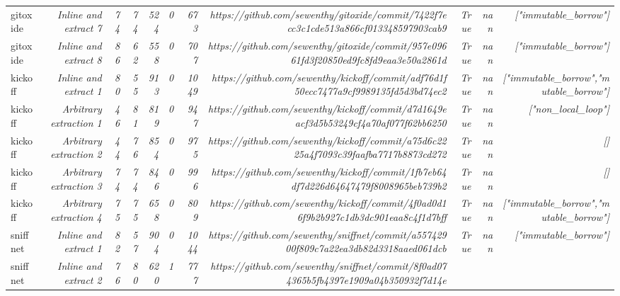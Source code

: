 \begin{table}[]
{\begin{tabular}{lrrrrrrrrrr}
gitoxide & \textit{Inline and extract 7} & \textit{74} & \textit{74} & \textit{524} & \textit{0} & \textit{673} & \textit{https://github.com/sewenthy/gitoxide/commit/7422f7ecc3c1cde513a866cf013348597903cab9
} & \textit{True} & \textit{nan} & \textit{["immutable_borrow"]} \\
gitoxide & \textit{Inline and extract 8} & \textit{86} & \textit{62} & \textit{558} & \textit{0} & \textit{707} & \textit{https://github.com/sewenthy/gitoxide/commit/957e09661fd3f20850ed9fc8fd9eaa3e50a2861d
} & \textit{True} & \textit{nan} & \textit{["immutable_borrow"]} \\
kickoff & \textit{Inline and extract 1} & \textit{80} & \textit{55} & \textit{913} & \textit{0} & \textit{1049} & \textit{https://github.com/sewenthy/kickoff/commit/adf76d1f50ecc7477a9cf9989135fd5d3bd74ec2
} & \textit{True} & \textit{nan} & \textit{["immutable_borrow","mutable_borrow"]} \\
kickoff & \textit{Arbitrary extraction 1} & \textit{46} & \textit{81} & \textit{819} & \textit{0} & \textit{947} & \textit{https://github.com/sewenthy/kickoff/commit/d7d1649eacf3d5b53249cf4a70af077f62bb6250
} & \textit{True} & \textit{nan} & \textit{["non_local_loop"]} \\
kickoff & \textit{Arbitrary extraction 2} & \textit{44} & \textit{76} & \textit{854} & \textit{0} & \textit{975} & \textit{https://github.com/sewenthy/kickoff/commit/a75d6c2225a4f7093c39faafba7717b8873cd272
} & \textit{True} & \textit{nan} & \textit{[]} \\
kickoff & \textit{Arbitrary extraction 3} & \textit{74} & \textit{74} & \textit{846} & \textit{0} & \textit{996} & \textit{https://github.com/sewenthy/kickoff/commit/1fb7eb64df7d226d64647479f8008965beb739b2
} & \textit{True} & \textit{nan} & \textit{[]} \\
kickoff & \textit{Arbitrary extraction 4} & \textit{75} & \textit{75} & \textit{658} & \textit{0} & \textit{809} & \textit{https://github.com/sewenthy/kickoff/commit/4f0ad0d16f9b2b927c1db3dc901eaa8c4f1d7bff
} & \textit{True} & \textit{nan} & \textit{["immutable_borrow","mutable_borrow"]} \\
sniffnet & \textit{Inline and extract 1} & \textit{82} & \textit{57} & \textit{904} & \textit{0} & \textit{1044} & \textit{https://github.com/sewenthy/sniffnet/commit/a55742900f809c7a22ea3db82d3318aaed061dcb
} & \textit{True} & \textit{nan} & \textit{["immutable_borrow"]} \\
sniffnet & \textit{Inline and extract 2} & \textit{76} & \textit{80} & \textit{620} & \textit{1} & \textit{777} & \textit{https://github.com/sewenthy/sniffnet/commit/8f0ad074365b5fb4397e1909a04b350932f7d14e
}
\end{tabular}}
\end{table}
